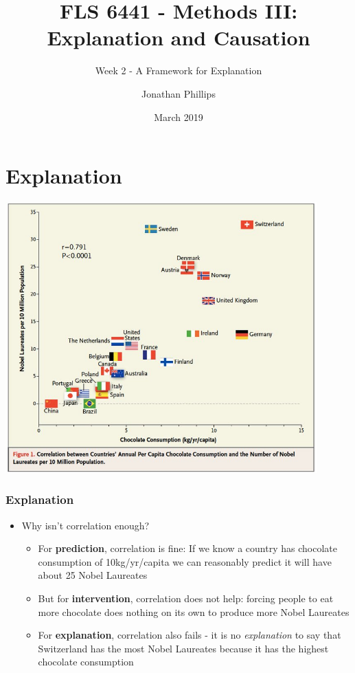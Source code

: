 \documentclass[xcolor=x11names,compress]{beamer}\usepackage[]{graphicx}\usepackage[]{color}
\title{FLS 6441 - Methods III: Explanation and Causation}
\subtitle{Week 2 - A Framework for Explanation}
\author{Jonathan Phillips}
\date{March 2019}
\renewcommand{\(}{\begin{columns}}
\renewcommand{\)}{\end{columns}}
\newcommand{\<}[1]{\begin{column}{#1}}
\renewcommand{\>}{\end{column}}
\begin{document}
\frame{\titlepage}

\section{Explanation}

\includegraphics[width=0.9\textwidth]{Chocolate_Nobel.jpg}

\begin{frame}
\frametitle{Explanation}
\small
\begin{itemize}
\item Why isn't correlation enough?
\pause
\begin{itemize}
\item For \textbf{prediction}, correlation is fine: If we know a country has chocolate consumption of 10kg/yr/capita we can reasonably predict it will have about 25 Nobel Laureates
\pause
\item But for \textbf{intervention}, correlation does not help: forcing people to eat more chocolate does nothing on its own to produce more Nobel Laureates
\pause
\item For \textbf{explanation}, correlation also fails - it is no \textit{explanation} to say that Switzerland has the most Nobel Laureates because it has the highest chocolate consumption
\end{itemize}
\end{itemize}
\normalsize
\end{frame}
\end{document}
